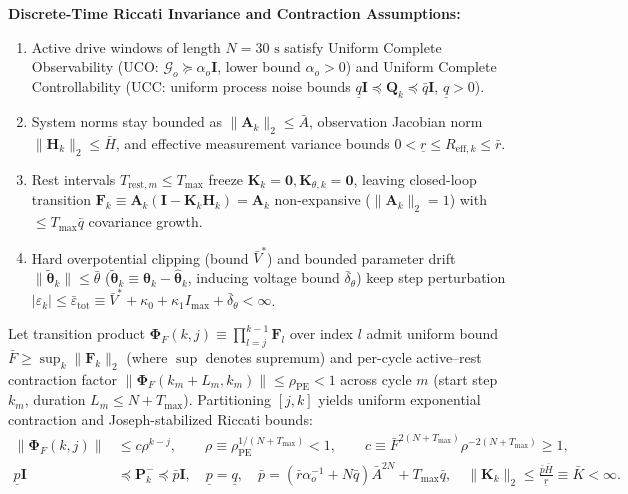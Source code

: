 \documentclass[10pt,a4paper]{article}
\begin{document}
\noindent\textbf{Discrete-Time Riccati Invariance and Contraction Assumptions:}
\begin{enumerate}[itemsep=1pt,topsep=2pt]
\item[(A1)] Active drive windows of length $N = 30\text{ s}$ satisfy Uniform Complete Observability (UCO: $\mathcal{G}_o \succeq \alpha_o \mathbf{I}$, lower bound $\alpha_o > 0$) and Uniform Complete Controllability (UCC: uniform process noise bounds $\underline{q}\mathbf{I} \preceq \mathbf{Q}_k \preceq \bar{q}\mathbf{I}$, $\underline{q} > 0$).
\item[(A2)] System norms stay bounded as $\|\mathbf{A}_k\|_2 \le \bar{A}$, observation Jacobian norm $\|\mathbf{H}_k\|_2 \le \bar{H}$, and effective measurement variance bounds $0 < \underline{r} \le R_{\text{eff},k} \le \bar{r}$.
\item[(A3)] Rest intervals $T_{\text{rest},m} \le T_{\max}$ freeze $\mathbf{K}_k = \mathbf{0}, \mathbf{K}_{\theta,k} = \mathbf{0}$, leaving closed-loop transition $\mathbf{F}_k \equiv \mathbf{A}_k(\mathbf{I} - \mathbf{K}_k\mathbf{H}_k) = \mathbf{A}_k$ non-expansive ($\|\mathbf{A}_k\|_2 = 1$) with $\le T_{\max}\bar{q}$ covariance growth.
\item[(A4)] Hard overpotential clipping (bound $\bar{V}^*$) and bounded parameter drift $\|\tilde{\boldsymbol{\theta}}_k\| \le \bar{\theta}$ ($\tilde{\boldsymbol{\theta}}_k \equiv \boldsymbol{\theta}_k - \hat{\boldsymbol{\theta}}_k$, inducing voltage bound $\bar{\delta}_\theta$) keep step perturbation $|\varepsilon_k| \le \bar{\varepsilon}_{\text{tot}} \equiv \bar{V}^* + \kappa_0 + \kappa_1 I_{\max} + \bar{\delta}_\theta < \infty$.
\end{enumerate}
Let transition product $\boldsymbol{\Phi}_F(k, j) \equiv \prod_{l=j}^{k-1}\mathbf{F}_l$ over index $l$ admit uniform bound $\bar{F} \ge \sup_k \|\mathbf{F}_k\|_2$ (where $\sup$ denotes supremum) and per-cycle active--rest contraction factor $\|\boldsymbol{\Phi}_F(k_m + L_m, k_m)\| \le \rho_{\text{PE}} < 1$ across cycle $m$ (start step $k_m$, duration $L_m \le N + T_{\max}$). Partitioning $[j, k]$ yields uniform exponential contraction and Joseph-stabilized Riccati bounds:
\begin{align*}
\|\boldsymbol{\Phi}_F(k, j)\| &\le c\rho^{k-j}, \qquad
\rho \equiv \rho_{\text{PE}}^{1/(N + T_{\max})} < 1, \qquad
c \equiv \bar{F}^{2(N + T_{\max})} \rho^{-2(N + T_{\max})} \ge 1, \\
\underline{p}\mathbf{I} &\preceq \mathbf{P}_k^- \preceq \bar{p}\mathbf{I}, \quad
\underline{p} = \underline{q}, \quad \bar{p} = (\bar{r}\alpha_o^{-1} + N\bar{q})\bar{A}^{2N} + T_{\max}\bar{q}, \quad
\|\mathbf{K}_k\|_2 \le \frac{\bar{p}\bar{H}}{\underline{r}} \equiv \bar{K} < \infty.
\end{align*}
\end{document}
